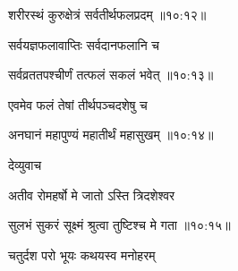 
{\devanagarifont शरीरस्थं कुरुक्षेत्रं सर्वतीर्थफलप्रदम् {॥१०:१२॥} \veg\dontdisplaylinenum }%

{\devanagarifont सर्वयज्ञफलावाप्तिः सर्वदानफलानि च \thinspace{\dandab} \dontdisplaylinenum }%


{\devanagarifont सर्वव्रततपश्चीर्णं तत्फलं सकलं भवेत् {॥१०:१३॥} \veg\dontdisplaylinenum }%

{\devanagarifont एवमेव फलं तेषां तीर्थपञ्चदशेषु च \thinspace{\dandab} \dontdisplaylinenum }%


{\devanagarifont अनघानं महापुण्यं महातीर्थं महासुखम् {॥१०:१४॥} \veg\dontdisplaylinenum }%

{\devanagarifont देव्युवाच {\dandab}\dontdisplaylinenum  }%
 
{\devanagarifont अतीव रोमहर्षो मे जातो ऽस्ति त्रिदशेश्वर \thinspace{\danda} \dontdisplaylinenum }%


{\devanagarifont सुलभं सुकरं सूक्ष्मं श्रुत्वा तुष्टिश्च मे गता {॥१०:१५॥} \veg\dontdisplaylinenum }%

{\devanagarifont चतुर्दश परो भूयः कथयस्व मनोहरम् \thinspace{\dandab} \dontdisplaylinenum }%
 
